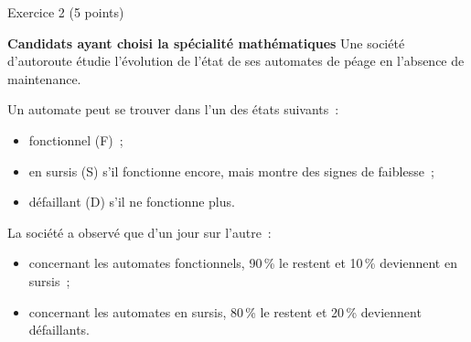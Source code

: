 
\begin{h2}Exercice 2 (5 points)\end{h2}
\textbf{Candidats ayant choisi la spécialité \og mathématiques \fg{}}
\medskip
Une société d'autoroute étudie l'évolution de l'état de ses automates de péage en
l'absence de maintenance.
\par
Un automate peut se trouver dans l'un des états suivants~:
\begin{itemize}
     \item fonctionnel (F)~;
     \item en sursis (S) s'il fonctionne encore, mais montre des signes de faiblesse~;
     \item défaillant (D) s'il ne fonctionne plus.
\end{itemize}
La société a observé que d'un jour sur l'autre~:
\begin{itemize}
     \item concernant les automates fonctionnels, 90\,\% le restent et 10\,\% deviennent
     en sursis~;
     \item concernant les automates en sursis, 80\,\% le restent et 20\,\% deviennent
     défaillants.
\end{itemize}
\bigskip
